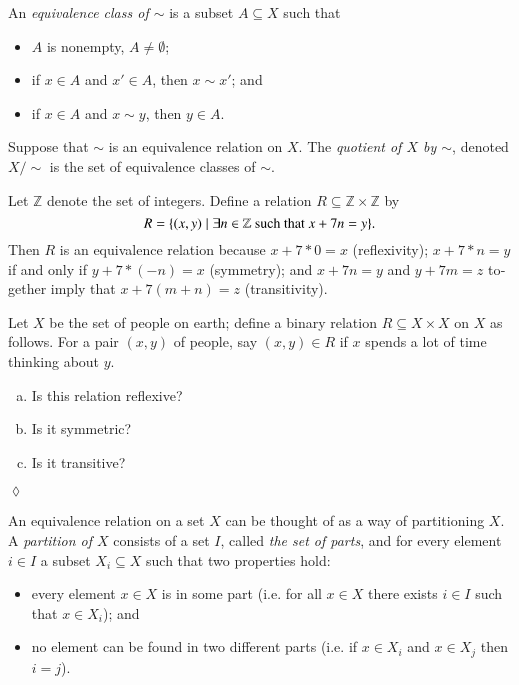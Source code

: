\documentclass{book}
\def\tn{\textnormal}
\def\ZZ{{\mathbb Z}}
\def\ss{\subseteq}
\def\|{{\;|\;}}
\theoremstyle{theoremENG}
\theoremstyle{lemmaENG}
\theoremstyle{propositionENG}
\theoremstyle{corollaryENG}
\theoremstyle{factENG}
\theoremstyle{remarkENG}
\theoremstyle{exampleENG}
\newtheorem{exampleENG}[subsubsection]{\begin{english}Example\end{english}}
\theoremstyle{warningENG}
\theoremstyle{questionENG}
\theoremstyle{guessENG}
\theoremstyle{answerENG}
\theoremstyle{constructionENG}
\theoremstyle{rulesENG}
\theoremstyle{excENG}
\newtheorem{excENG}[subsubsection]{\begin{english}Exercise\end{english}}
\theoremstyle{appENG}
\theoremstyle{definitionENG}
\newtheorem{definitionENG}[subsubsection]{\begin{english}Definition\end{english}}
\theoremstyle{notationENG}
\theoremstyle{conjectureENG}
\theoremstyle{postulateENG}
\newenvironment{exerciseENG}{\begin{excENG}}{\hspace*{\fill}$\lozenge$\end{excENG}}
\theoremstyle{theoremRUS}
\theoremstyle{lemmaRUS}
\theoremstyle{propositionRUS}
\theoremstyle{corollaryRUS}
\theoremstyle{factRUS}
\theoremstyle{remarkRUS}
\theoremstyle{exampleRUS}
\theoremstyle{warningRUS}
\theoremstyle{questionRUS}
\theoremstyle{guessRUS}
\theoremstyle{answerRUS}
\theoremstyle{constructionRUS}
\theoremstyle{rulesRUS}
\theoremstyle{excRUS}
\theoremstyle{appRUS}
\theoremstyle{definitionRUS}
\theoremstyle{notationRUS}
\theoremstyle{conjectureRUS}
\theoremstyle{postulateRUS}
\def\sexc{\begin{enumerate}[a.)]\setlength{\itemsep}{.1cm}\setlength{\parskip}{.1cm}\item}
\def\next{\item}
\def\endsexc{\end{enumerate}}
\begin{document}
\begin{english}
\begin{definitionENG}
An {\em equivalence class of $\sim$} is a subset $A\ss X$ such that
\begin{itemize}
\item $A$ is nonempty, $A\neq\emptyset$;
\item if $x\in A$ and $x'\in A$, then $x\sim x'$; and 
\item if $x\in A$ and $x\sim y$, then $y\in A$.
\end{itemize}
Suppose that $\sim$ is an equivalence relation on $X$. The {\em quotient of $X$ by $\sim$}, denoted $X/\sim$ is the set of equivalence classes of $\sim$.

\begin{russian} \end{russian}

\end{definitionENG}

\begin{exampleENG}

Let $\ZZ$ denote the set of integers. Define a relation $R\ss\ZZ\times\ZZ$ by $$R=\{(x,y)\|\exists n\in\ZZ \tn{ such that } x+7n=y\}.$$ Then $R$ is an equivalence relation because $x+7*0=x$ (reflexivity); $x+7*n=y$ if and only if $y+7*(-n)= x$ (symmetry); and $x+7n=y$ and $y+7m=z$ together imply that $x+7(m+n)=z$ (transitivity).

\begin{russian} \end{russian}

\end{exampleENG}

\begin{exerciseENG}

Let $X$ be the set of people on earth; define a binary relation $R\ss X\times X$ on $X$ as follows. For a pair $(x,y)$ of people, say $(x,y)\in R$ if $x$ spends a lot of time thinking about $y$. 
\sexc Is this relation reflexive? 
\next Is it symmetric? 
\next Is it transitive?
\endsexc

\begin{russian} \end{russian}

\end{exerciseENG}

\begin{exampleENG}[Partitions]\label{ex:partition}

An equivalence relation on a set $X$ can be thought of as a way of partitioning $X$. A {\em partition of $X$} consists of a set $I$, called {\em the set of parts}, and for every element $i\in I$ a subset $X_i\ss X$ such that two properties hold:
\begin{itemize}
\item every element $x\in X$ is in some part (i.e. for all $x\in X$ there exists $i\in I$ such that $x\in X_i$); and
\item no element can be found in two different parts (i.e. if $x\in X_i$ and $x\in X_j$ then $i=j$).
\end{itemize}


\end{exampleENG}
\end{english}
\end{document}

